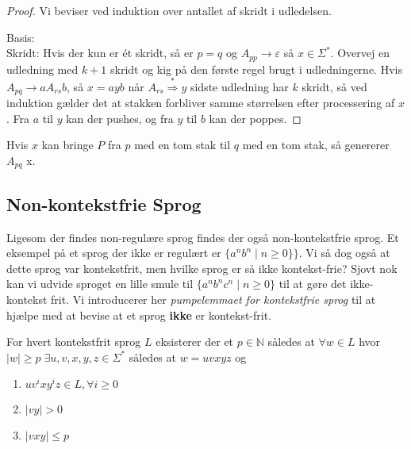 \begin{proof}
	Vi beviser ved induktion over antallet af skridt i udledelsen.

	Basis:\\ %
	 Skridt: Hvis der kun er ét skridt, så er $p = q$ og $A_{pp} \rightarrow \varepsilon$ så $x \in \Sigma^{*}$.
	Overvej en udledning med $k+1$ skridt og kig på den første regel brugt i udledningerne. Hvis $A_{pq} \rightarrow aA_{rs}b$, så $x = ayb$ når $A_{rs} \stackrel{*}{\Rightarrow} y$ sidste udledning har $k$ skridt, så ved induktion gælder det at stakken forbliver samme størrelsen efter processering af $x$. Fra $a$ til $y$ kan der pushes, og fra $y$ til $b$ kan der poppes.
\end{proof}

\begin{claim}
	Hvis $x$ kan bringe $P$ fra $p$ med en tom stak til $q$ med en tom stak, så genererer $A_{pq}$ x.
\end{claim}




\newpage
\subsection{Non-kontekstfrie Sprog}%
\label{subsec:noncfl}

Ligesom der findes non-regulære sprog findes der også non-kontekstfrie sprog. Et eksempel på et sprog der ikke er regulært er $\{a^{n}b^{n} \;|\; n \ge 0\}\}$. Vi så dog også at dette sprog var kontekstfrit, men hvilke sprog er så ikke kontekst-frie? Sjovt nok kan vi udvide sproget en lille smule til $\{a^{n}b^{n}c^{n} \;|\; n \ge 0\}$ til at gøre det ikke-kontekst frit. Vi introducerer her \textit{pumpelemmaet for kontekstfrie sprog} til at hjælpe med at bevise at et sprog \textbf{ikke} er kontekst-frit.

\begin{theorem}
	\label{teo:pumpelemmacfg}
	For hvert kontekstfrit sprog $L$ eksisterer der et $p \in \mathbb{N}$ således at $\forall w \in L$ hvor $|w| \geq p\; \exists u,v,x,y,z \in \Sigma^{*}$ således at $w = uvxyz$ og
	\begin{enumerate}
		\item $uv^{i}xy^{i}z \in L, \forall i \ge 0$
		\item $|vy| > 0$
		\item $|vxy| \le p$
	\end{enumerate}
\end{theorem}

